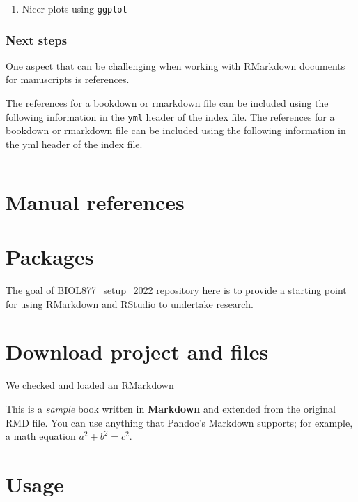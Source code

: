 \documentclass[
]{book}
\providecommand{\tightlist}{%
  \setlength{\itemsep}{0pt}\setlength{\parskip}{0pt}}
\begin{document}
\begin{enumerate}
\def\labelenumi{\arabic{enumi}.}
\setcounter{enumi}{5}
\tightlist
\item
  Nicer plots using \texttt{ggplot}
\end{enumerate}

\hypertarget{next-steps}{%
\subsubsection{Next steps}\label{next-steps}}

One aspect that can be challenging when working with RMarkdown documents for manuscripts is references.

The references for a bookdown or rmarkdown file can be included using the following information in the \texttt{yml} header of the index file.
The references for a bookdown or rmarkdown file can be included using the following information in the yml header of the index file.

\begin{verbatim}
\end{verbatim}

\hypertarget{manual-references}{%
\section{Manual references}\label{manual-references}}

\hypertarget{packages}{%
\section{Packages}\label{packages}}

The goal of BIOL877\_setup\_2022 repository here is to provide a starting point for using RMarkdown and RStudio to undertake research.

\hypertarget{download-project-and-files}{%
\section{Download project and files}\label{download-project-and-files}}

We checked and loaded an RMarkdown

This is a \emph{sample} book written in \textbf{Markdown} and extended from the original RMD file. You can use anything that Pandoc's Markdown supports; for example, a math equation \(a^2 + b^2 = c^2\).

\hypertarget{usage}{%
\section{Usage}\label{usage}}
\end{document}
